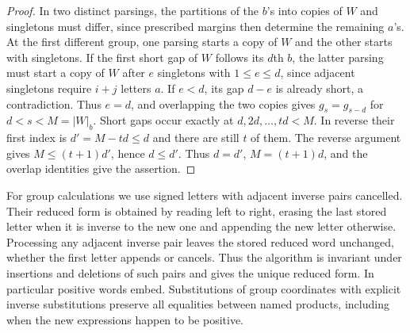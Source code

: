 \documentclass[11pt,a4paper]{article}
\newcommand{\bct}[1]{\lvert #1\rvert_b}
\begin{document}
\begin{proof}
In two distinct parsings, the partitions of the $b$'s into copies of $W$ and singletons must differ, since prescribed margins then determine the remaining $a$'s. At the first different group, one parsing starts a copy of $W$ and the other starts with singletons. If the first short gap of $W$ follows its $d$th $b$, the latter parsing must start a copy of $W$ after $e$ singletons with $1\le e\le d$, since adjacent singletons require $i+j$ letters $a$. If $e<d$, its gap $d-e$ is already short, a contradiction. Thus $e=d$, and overlapping the two copies gives $g_s=g_{s-d}$ for $d<s<M=\bct W$. Short gaps occur exactly at $d,2d,\ldots,td<M$. In reverse their first index is $d'=M-td\le d$ and there are still $t$ of them. The reverse argument gives $M\le(t+1)d'$, hence $d\le d'$. Thus $d=d'$, $M=(t+1)d$, and the overlap identities give the assertion.
\end{proof}
For group calculations we use signed letters with adjacent inverse pairs cancelled. Their reduced form is obtained by reading left to right, erasing the last stored letter when it is inverse to the new one and appending the new letter otherwise. Processing any adjacent inverse pair leaves the stored reduced word unchanged, whether the first letter appends or cancels. Thus the algorithm is invariant under insertions and deletions of such pairs and gives the unique reduced form. In particular positive words embed. Substitutions of group coordinates with explicit inverse substitutions preserve all equalities between named products, including when the new expressions happen to be positive.
\end{document}
